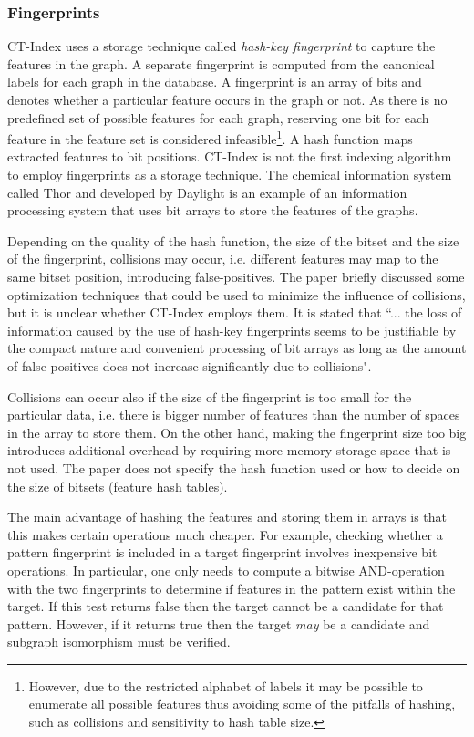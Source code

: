 \documentclass{l4proj}
\newcounter{example}[section]
\begin{document}
\subsubsection{Fingerprints}
CT-Index uses a storage technique called \emph{hash-key fingerprint} to capture the features in the graph. A separate fingerprint is computed from the canonical labels for each graph in the database. A fingerprint is an array of bits and denotes whether a particular feature occurs in the graph or not. As there is no predefined set of possible features for each graph, reserving one bit for each feature in the feature set is considered infeasible\footnote{However, due to the restricted alphabet of labels it may be possible to enumerate all possible features thus avoiding some of the pitfalls of hashing, such as collisions and sensitivity to hash table size.}. A hash function maps extracted features to bit positions.
CT-Index is not the first indexing algorithm to employ fingerprints as a storage technique. The chemical information system called Thor and developed by Daylight \cite{fingerprints} is an example of an information processing system that uses bit arrays to store the features of the graphs.

Depending on the quality of the hash function, the size of the bitset and the size of the fingerprint, collisions may occur, i.e. different features may map to the same bitset position, introducing false-positives. The \cite{ctindex} paper briefly discussed some optimization techniques that could be used to minimize the influence of collisions, but it is unclear whether CT-Index employs them. 
It is stated that ``... the loss of information caused by the use of hash-key fingerprints seems to be justifiable by the compact nature and convenient processing of bit arrays as long as the amount of false positives does not increase significantly due to collisions".

Collisions can occur also if the size of the fingerprint is too small for the particular data, i.e. there is bigger number of features than the number of spaces in the array to store them. On the other hand, making the fingerprint size too big introduces additional overhead by requiring more memory storage space that is not used. The paper does not specify the hash function used or how to decide on the size of bitsets (feature hash tables). 

The main advantage of hashing the features and storing them in arrays is that this makes certain operations much cheaper. For example, checking whether a pattern fingerprint is included in a target fingerprint involves inexpensive bit operations. In particular, one only needs to compute a bitwise AND-operation with the two fingerprints to determine if features in the pattern exist within the target. If this test returns false then the target cannot be a candidate for that pattern. However, if it returns true then the target \emph{may} be a candidate and subgraph isomorphism must be verified.
\end{document}
